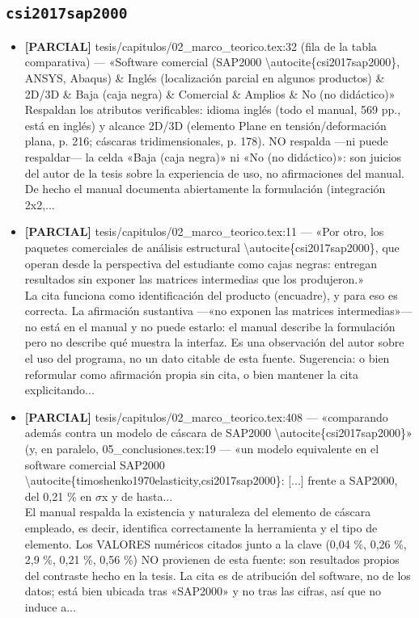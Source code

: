 \documentclass[11pt,a4paper]{article}
\newcommand{\campo}[1]{\textcolor{gris}{\footnotesize #1}}
\begin{document}
\subsection{\texttt{csi2017sap2000}}
\begin{itemize}\small
\item \textbf{[PARCIAL]} tesis/capitulos/02\_marco\_teorico.tex:32 (fila de la tabla comparativa) --- «Software comercial (SAP2000 \textbackslash{}autocite\{csi2017sap2000\}, ANSYS, Abaqus) \& Inglés (localización parcial en algunos productos) \& 2D/3D \& Baja (caja negra) \& Comercial \& Amplios \& No (no didáctico)»
\\ \campo{Respaldan los atributos verificables: idioma inglés (todo el manual, 569 pp., está en inglés) y alcance 2D/3D (elemento Plane en tensión/deformación plana, p. 216; cáscaras tridimensionales, p. 178). NO respalda ---ni puede respaldar--- la celda «Baja (caja negra)» ni «No (no didáctico)»: son juicios del autor de la tesis sobre la experiencia de uso, no afirmaciones del manual. De hecho el manual documenta abiertamente la formulación (integración 2x2,...}
\item \textbf{[PARCIAL]} tesis/capitulos/02\_marco\_teorico.tex:11 --- «Por otro, los paquetes comerciales de análisis estructural \textbackslash{}autocite\{csi2017sap2000\}, que operan desde la perspectiva del estudiante como cajas negras: entregan resultados sin exponer las matrices intermedias que los produjeron.»
\\ \campo{La cita funciona como identificación del producto (encuadre), y para eso es correcta. La afirmación sustantiva ---«no exponen las matrices intermedias»--- no está en el manual y no puede estarlo: el manual describe la formulación pero no describe qué muestra la interfaz. Es una observación del autor sobre el uso del programa, no un dato citable de esta fuente. Sugerencia: o bien reformular como afirmación propia sin cita, o bien mantener la cita explicitando...}
\item \textbf{[PARCIAL]} tesis/capitulos/02\_marco\_teorico.tex:408 --- «comparando además contra un modelo de cáscara de SAP2000 \textbackslash{}autocite\{csi2017sap2000\}» (y, en paralelo, 05\_conclusiones.tex:19 --- «un modelo equivalente en el software comercial SAP2000 \textbackslash{}autocite\{timoshenko1970elasticity,csi2017sap2000\}: [...] frente a SAP2000, del 0,21 \% en $\sigma$x y de hasta...
\\ \campo{El manual respalda la existencia y naturaleza del elemento de cáscara empleado, es decir, identifica correctamente la herramienta y el tipo de elemento. Los VALORES numéricos citados junto a la clave (0,04 \%, 0,26 \%, 2,9 \%, 0,21 \%, 0,56 \%) NO provienen de esta fuente: son resultados propios del contraste hecho en la tesis. La cita es de atribución del software, no de los datos; está bien ubicada tras «SAP2000» y no tras las cifras, así que no induce a...}
\end{itemize}
\end{document}
